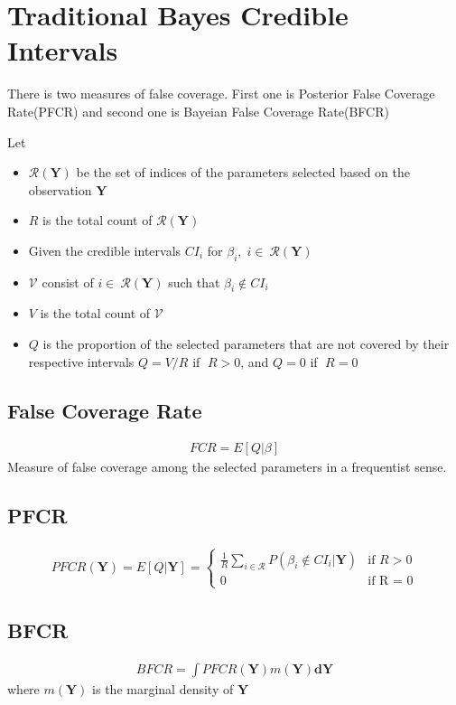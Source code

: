 \documentclass[11pt]{article}
\begin{document}
\section{Traditional Bayes Credible Intervals}
There is two measures of false coverage. First one is Posterior False Coverage Rate(PFCR) and second one is Bayeian False Coverage Rate(BFCR)

Let
\begin{itemize}
	\item $\mathcal{R}(\boldsymbol{Y})$ be the set of indices of the parameters selected based on the observation $\boldsymbol{Y}$
	\item $R$ is the total count of $\mathcal{R}(\boldsymbol{Y})$
	\item Given the credible intervals $CI_i$ for $\beta_i,\; i \in\ \mathcal{R}(\boldsymbol{Y})$
	\item $\mathcal{V}$ consist of $ i \in\ \mathcal{R}(\boldsymbol{Y})$ such that $\beta_i \notin CI_i$
	\item $V$ is the total count of $\mathcal{V}$
	\item $Q$ is the proportion of the selected parameters that are not covered by their respective intervals $Q = V / R$ if $\;R >0$, and $Q=0$ if $\;R=0$
\end{itemize}

\subsection{False Coverage Rate}
\begin{align*}
FCR = E[Q | \beta]
\end{align*}
Measure of false coverage among the selected parameters in a frequentist sense.
\subsection{PFCR}
\begin{align*}
PFCR(\boldsymbol{Y}) = E[Q | \boldsymbol{Y}] =  \begin{cases} \frac{1}{R} \sum_{i \in \mathcal{R}}P(\beta_i \notin CI_i | \boldsymbol{Y}) &\text{if $R >0$} \\
0 &\text{if R = 0} \end{cases}
\end{align*}

\subsection{BFCR}
\begin{align*}
BFCR = \int PFCR(\boldsymbol{Y}) m(\boldsymbol{Y})\boldsymbol{d} \boldsymbol{Y}
\end{align*}
where $m(\boldsymbol{Y})$ is the marginal density of $\boldsymbol{Y}$\\
\end{document}
